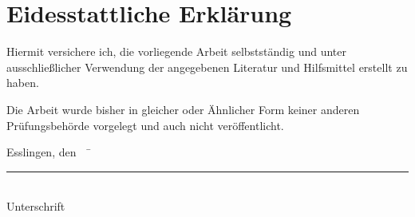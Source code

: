 \chapter*{Eidesstattliche Erklärung}

Hiermit versichere ich, die vorliegende Arbeit selbstständig und unter ausschließlicher Verwendung der angegebenen Literatur und Hilfsmittel erstellt zu haben.

Die Arbeit wurde bisher in gleicher oder Ähnlicher Form keiner anderen Prüfungsbehörde vorgelegt und auch nicht veröffentlicht.

\begin{tabbing}
          Esslingen, den \workDatum~~\= \rule{5cm}{0.3mm}\\
                                                                                                    \> Unterschrift
\end{tabbing}
